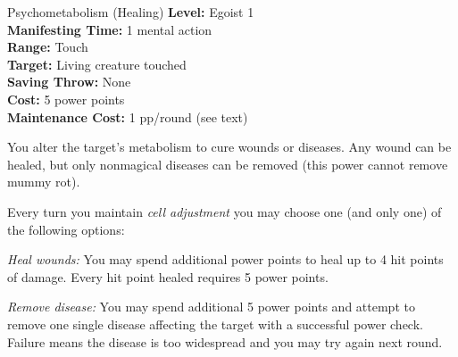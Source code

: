 {Psychometabolism (Healing)}
{
	\textbf{Level:}
	Egoist 1\\
	\textbf{Manifesting Time:}
	1 mental action\\
	\textbf{Range:}
	Touch\\
	\textbf{Target:}
	Living creature touched\\
	\textbf{Saving Throw:}
	None\\
	\textbf{Cost:}
	5 power points\\
	\textbf{Maintenance Cost:}
	1 pp/round (see text)\\
}
{
	You alter the target's metabolism to cure wounds or diseases. Any wound can be healed, but only nonmagical diseases can be removed (this power cannot remove mummy rot).

	Every turn you maintain \emph{cell adjustment} you may choose one (and only one) of the following options:
	\begin{itemize*}
		\item \textit{Heal wounds:} You may spend additional power points to heal up to 4 hit points of damage. Every hit point healed requires 5 power points.

		\item \textit{Remove disease:} You may spend additional 5 power points and attempt to remove one single disease affecting the target with a successful power check. Failure means the disease is too widespread and you may try again next round.
	\end{itemize*}
}
